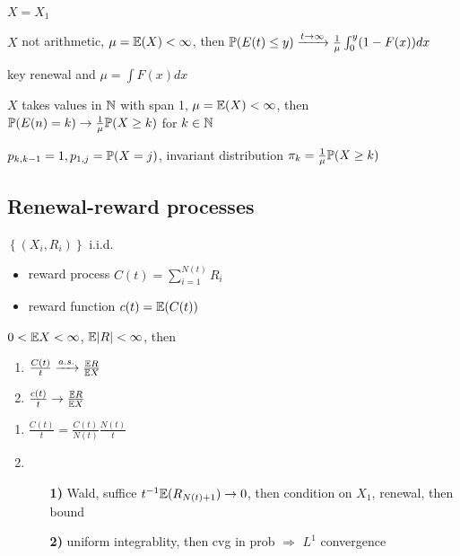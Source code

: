 \begin{setting}
    $X = X_1$
\end{setting}

\begin{thm}
    $X$ not arithmetic, $\mu = \mathbb{E}(X) < \infty$, then $\mathbb{P}(E(t) \leq y) \xrightarrow{t \rightarrow \infty} \frac{1}{\mu} \int_0^y (1 - F(x)) dx$
\end{thm}
\begin{pf}
    key renewal and $\mu = \int F(x) dx$
\end{pf}

\begin{thm}
    $X$ takes values in $\mathbb{N}$ with span 1, $\mu = \mathbb{E}(X) < \infty$, then $\mathbb{P}(E(n) = k) \rightarrow \frac{1}{\mu}\mathbb{P}(X \geq k)$ for $k \in \mathbb{N}$
\end{thm}
\begin{pf}
    $p_{k, k-1} = 1, p_{1, j} = \mathbb{P}(X = j)$, invariant distribution $\pi_k = \frac{1}{\mu}\mathbb{P}(X \geq k)$
\end{pf}

\subsection{Renewal-reward processes}\label{subsec:renewal-reward-processes}

\begin{setting}
    $\left\{ (X_i, R_i) \right\}$ i.i.d.\
\end{setting}

\begin{itemize}
    \item reward process $C(t) = \sum^{N(t)}_{i=1} R_i$
    \item reward function $c(t) = \mathbb{E}(C(t))$
\end{itemize}

\begin{thm}
    $0 < \mathbb{E} X < \infty$, $\mathbb{E}|R| < \infty$, then
    \begin{enumerate}
        \item $\frac{C(t)}{t} \xrightarrow{a.s.} \frac{\mathbb{E} R}{\mathbb{E} X}$
        \item $\frac{c(t)}{t} \rightarrow \frac{\mathbb{E} R}{\mathbb{E} X}$
    \end{enumerate}
\end{thm}
\begin{pf}
    \begin{enumerate}
        \item $\frac{C(t)}{t} = \frac{C(t)}{N(t)} \frac{N(t)}{t}$
        \item
        \begin{enumerate}
            \item[\textbf{1)}] Wald, suffice $t^{-1} \mathbb{E}(R_{N(t) + 1}) \rightarrow 0$, then condition on $X_1$, renewal, then bound
            \item[\textbf{2)}] uniform integrablity, then cvg in prob $\Rightarrow$ $L^1$ convergence
        \end{enumerate}
    \end{enumerate}
\end{pf}

